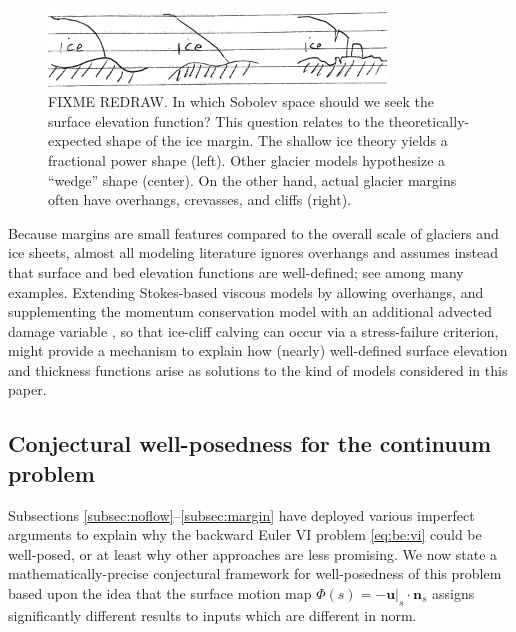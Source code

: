 \documentclass[hidelinks,onefignum,onetabnum,final]{siamart220329}  %
\newcommand{\bn}{\mathbf{n}}
\newcommand{\bu}{\mathbf{u}}
\begin{document}
\begin{figure}[ht]
\begin{center}
\includegraphics[width=0.8\textwidth]{figs/margins.jpg}
\end{center}
\caption{FIXME REDRAW.  In which Sobolev space should we seek the surface elevation function?  This question relates to the theoretically-expected shape of the ice margin.  The shallow ice theory yields a fractional power shape (left).  Other glacier models hypothesize a ``wedge'' shape (center).  On the other hand, actual glacier margins often have overhangs, crevasses, and cliffs (right).}
\label{fig:margins}
\end{figure}

Because margins are small features compared to the overall scale of glaciers and ice sheets, almost all modeling literature ignores overhangs and assumes instead that surface and bed elevation functions are well-defined; see \cite{IsaacStadlerGhattas2015,Jouvetetal2008,LofgrenAhlkronaHelanow2022,WirbelJarosch2020} among many examples.  Extending Stokes-based viscous models by allowing overhangs, and supplementing the momentum conservation model with an additional advected damage variable \cite{PralongFunk2005}, so that ice-cliff calving can occur via a stress-failure criterion, might provide a mechanism to explain how (nearly) well-defined surface elevation and thickness functions arise as solutions to the kind of models considered in this paper.

\subsection{Conjectural well-posedness for the continuum problem} \label{subsec:conjecture} Subsections \ref{subsec:noflow}--\ref{subsec:margin} have deployed various imperfect arguments to explain why the backward Euler VI problem \eqref{eq:be:vi} could be well-posed, or at least why other approaches are less promising.  We now state a mathematically-precise conjectural framework for well-posedness of this problem based upon the idea that the surface motion map $\Phi(s) = -\bu|_s\cdot \bn_s$ assigns significantly different results to inputs which are different in norm.
\end{document}
